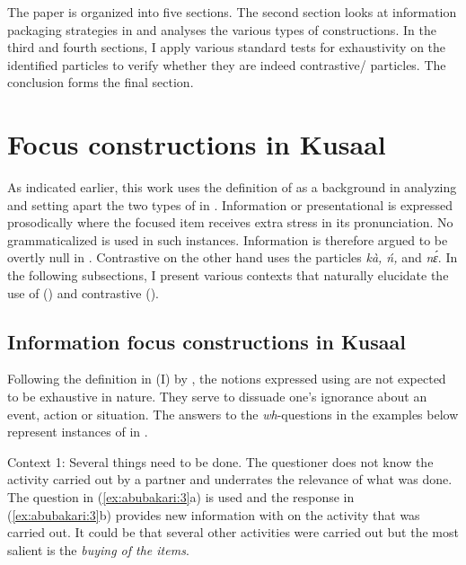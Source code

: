 \documentclass[output=paper,modfonts,nonflat,
 hidelinks
]{langsci/langscibook}
\begin{document}
The paper is organized into five sections. The second section looks at information packaging strategies in  and analyses the various types of  constructions. In the third and fourth sections, I apply various standard tests for exhaustivity on the identified  particles to verify whether they are indeed contrastive{\slash} particles. The conclusion forms the final section.

\section{Focus constructions in {Kusaal}}

As indicated earlier, this work uses the definition of \citet{ÉKiss1998} as a background in analyzing and setting apart the two types of  in . Information or presentational  is expressed prosodically where the focused item receives extra stress in its pronunciation. No grammaticalized  is used in such instances. Information  is therefore argued to be overtly null in . Contrastive  on the other hand uses the particles \textit{kà, ń,} and \textit{nɛ́}. In the following subsections, I present various contexts that naturally elucidate the use of  () and contrastive  ().

\subsection{Information focus constructions in {Kusaal}}\label{sec:abubakari:2.1}

Following the definition in (I) by \citet[246]{ÉKiss1998}, the notions expressed using  are not expected to be exhaustive in nature. They serve to dissuade one’s ignorance about an event, action or situation. The answers to the \textit{wh}{}-questions in the examples below represent instances of  in . 

Context 1: Several things need to be done. The questioner does not know the activity carried out by a partner and underrates the relevance of what was done. The question in (\ref{ex:abubakari:3}a) is used and the response in (\ref{ex:abubakari:3}b) provides new information with  on the activity that was carried out. It could be that several other activities were carried out but the most salient is the \textit{buying of the items}.
 
\end{document}
